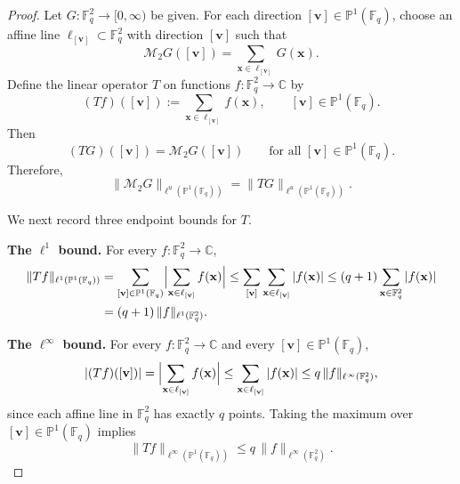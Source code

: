 \documentclass[11pt]{article}
\newcommand{\1}{\mathbf 1}
\begin{document}
 \begin{proof}
Let $G:\mathbb{F}_q^2\to[0,\infty)$ be given.
For each direction $[\mathbf{v}]\in\mathbb{P}^1(\mathbb{F}_q)$, choose an affine line
$\ell_{[\mathbf{v}]}\subset\mathbb{F}_q^2$ with direction $[\mathbf{v}]$ such that
\[
\mathcal{M}_{2}G([\mathbf{v}])=\sum_{\mathbf{x} \in \ell_{[\mathbf{v}]}} G(\mathbf{x}).
\]
Define the linear operator $T$ on functions $f:\mathbb{F}_q^2\to\mathbb{C}$ by
\[
(T f)([\mathbf{v}]):=\sum_{\mathbf{x} \in\ell_{[\mathbf{v}]}} f(\mathbf{x}),
\qquad [\mathbf{v}]\in\mathbb{P}^1(\mathbb{F}_q).
\]
Then
\begin{equation}\label{eq:TG-linearizes}
(T G)([\mathbf{v}])=\mathcal{M}_{2}G([\mathbf{v}])
\qquad\text{for all }[\mathbf{v}]\in\mathbb{P}^1(\mathbb{F}_q).
\end{equation}
Therefore,
\begin{equation}\label{eq:reduce-to-TG}
\|\mathcal{M}_{2}G\|_{\ell^u(\mathbb{P}^1(\mathbb{F}_q))}
=
\|T G\|_{\ell^u(\mathbb{P}^1(\mathbb{F}_q))}.
\end{equation}

We next record three endpoint bounds for $T$.


\medskip
\noindent\textbf{The $\ell^1$ bound.}
For every $f:\mathbb{F}_q^2\to\mathbb{C}$,
\begin{align}\label{eq:TG-l1}
\|T f\|_{\ell^1(\mathbb{P}^1(\mathbb{F}_q))}
&=
\sum_{[\mathbf{v}]\in\mathbb{P}^1(\mathbb{F}_q)}
\Bigl|\sum_{\mathbf{x} \in\ell_{[\mathbf{v}]}} f(\mathbf{x})\Bigr|
\le
\sum_{[\mathbf{v}]}\sum_{\mathbf{x} \in\ell_{[\mathbf{v}]}}|f(\mathbf{x})|
\le
(q+1)\sum_{\mathbf{x} \in\mathbb{F}_q^2}|f(\mathbf{x})| \notag\\
&=
(q+1)\,\|f\|_{\ell^1(\mathbb{F}_q^2)}.
\end{align}

\medskip
\noindent\textbf{The $\ell^\infty$ bound.}
For every $f:\mathbb{F}_q^2\to\mathbb{C}$ and every $[\mathbf{v}]\in \mathbb{P}^1(\mathbb{F}_q)$,
\[
|(T f)([\mathbf{v}])|
=
\Bigl|\sum_{\mathbf{x} \in\ell_{[\mathbf{v}]}} f(\mathbf{x})\Bigr|
\le
\sum_{\mathbf{x} \in\ell_{[\mathbf{v}]}}|f(\mathbf{x})|
\le
q\,\|f\|_{\ell^\infty(\mathbb{F}_q^2)},
\]
since each affine line in $\mathbb{F}_q^2$ has exactly $q$ points.
Taking the maximum over $[\mathbf{v}]\in \mathbb{P}^1(\mathbb{F}_q)$ implies
\begin{equation}\label{eq:TG-linfty}
\|T f\|_{\ell^\infty(\mathbb{P}^1(\mathbb{F}_q))}
\le
q\,\|f\|_{\ell^\infty(\mathbb{F}_q^2)}.
\end{equation}


\end{proof}
\end{document}
